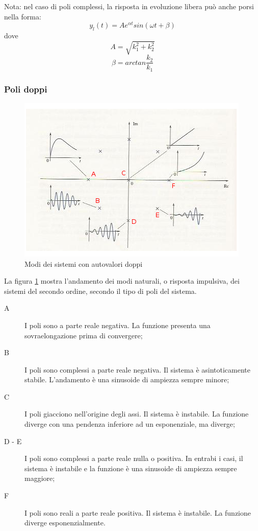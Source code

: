 \documentclass[a4paper]{report}
\begin{document}
Nota: nel caso di poli complessi, la risposta in evoluzione libera
pu\`o anche  porsi nella forma:
\[
y_l(t) = A e^{\alpha t} sin(\omega t + \beta)
\]
dove
\[
A = \sqrt{k^2_1 + k^2_2}
\]
\[
\beta = arctan \dfrac{k_2}{k_1}
\]

\subsubsection{Poli doppi}
\begin{figure}[!h]
  \begin{center}
    \includegraphics[scale=0.7]{./figures/modidoppi.png}
    \caption{Modi dei sistemi con autovalori doppi}\label{fig:modidop}
  \end{center}
\end{figure}
La figura \ref{fig:modidop} mostra l'andamento dei modi naturali, o
risposta impulsiva, dei sistemi del secondo ordine, secondo il tipo di
poli del sistema.

\begin{description}
\item[A] I poli sono a parte reale negativa. La funzione presenta una
  sovraelongazione prima di convergere;
\item[B] I poli sono complessi a parte reale negativa. Il sistema \`e
  asintoticamente stabile. L'andamento \`e una sinusoide di ampiezza
  sempre minore;
\item[C] I poli giacciono nell'origine degli assi. Il sistema \`e
  instabile. La funzione diverge con una pendenza inferiore ad un
  esponenziale, ma diverge;
\item[D - E] I poli sono complessi a parte reale nulla o positiva. In
  entrabi i casi, il sistema \`e instabile e la funzione \`e una
  sinusoide di ampiezza sempre maggiore;
\item[F] I poli sono reali a parte reale positiva. Il sistema \`e
  instabile. La funzione diverge esponenzialmente.
\end{description}
\end{document}
